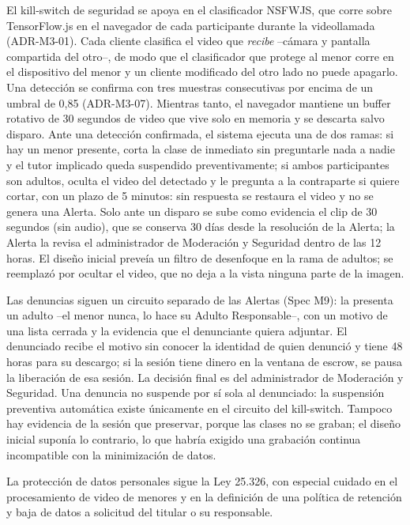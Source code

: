 El kill-switch de seguridad se apoya en el clasificador NSFWJS,
que corre sobre TensorFlow.js en el navegador de cada participante
durante la videollamada (ADR-M3-01). Cada cliente clasifica el video que
\emph{recibe} --cámara y pantalla compartida del otro--, de modo que el
clasificador que protege al menor corre en el dispositivo del menor y un
cliente modificado del otro lado no puede apagarlo. Una detección se
confirma con tres muestras consecutivas por encima de un umbral de 0,85
(ADR-M3-07). Mientras tanto, el navegador mantiene un buffer rotativo de
30 segundos de video que vive solo en memoria y se descarta salvo
disparo. Ante una detección confirmada, el sistema ejecuta una de dos
ramas: si hay un menor presente, corta la clase de inmediato sin
preguntarle nada a nadie y el tutor implicado queda suspendido
preventivamente; si ambos participantes son adultos, oculta el video del
detectado y le pregunta a la contraparte si quiere cortar, con un plazo
de 5 minutos: sin respuesta se restaura el video y no se genera una
Alerta. Solo ante un disparo se sube como evidencia el clip de 30
segundos (sin audio), que se conserva 30 días desde la resolución de la
Alerta; la Alerta la revisa el administrador de Moderación y Seguridad
dentro de las 12 horas. El diseño inicial preveía un filtro de
desenfoque en la rama de adultos; se reemplazó por ocultar el video, que
no deja a la vista ninguna parte de la imagen.

Las denuncias siguen un circuito separado de las Alertas (Spec M9): la
presenta un adulto --el menor nunca, lo hace su Adulto Responsable--,
con un motivo de una lista cerrada y la evidencia que el denunciante
quiera adjuntar. El denunciado recibe el motivo sin conocer la identidad
de quien denunció y tiene 48 horas para su descargo; si la sesión tiene
dinero en la ventana de \gls{escrow}, se pausa la liberación de esa
sesión. La decisión final es del administrador de Moderación y
Seguridad. Una denuncia no suspende por sí sola al denunciado: la
suspensión preventiva automática existe únicamente en el circuito del
kill-switch. Tampoco hay evidencia de la sesión que preservar, porque las
clases no se graban; el diseño inicial suponía lo contrario, lo que
habría exigido una grabación continua incompatible con la minimización
de datos.

La protección de datos personales sigue la Ley 25.326, con especial
cuidado en el procesamiento de video de menores y en la definición de una
política de retención y baja de datos a solicitud del titular o su
responsable.

